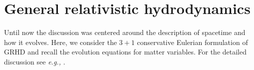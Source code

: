 \section{General relativistic hydrodynamics}\label{sec:theory:grhd}

Until now the discussion was centered around the description of spacetime and how it 
evolves. Here, we consider the $3+1$ conservative Eulerian formulation of \ac{GRHD} and recall the 
evolution equations for matter variables. 
For the detailed discussion see \textit{e.g.,} \citet{Misner:1973,Schutz:2009a,Gourgoulhon:2006bn,Andersson:2006nr,Rezzolla:2013}.
%
%
